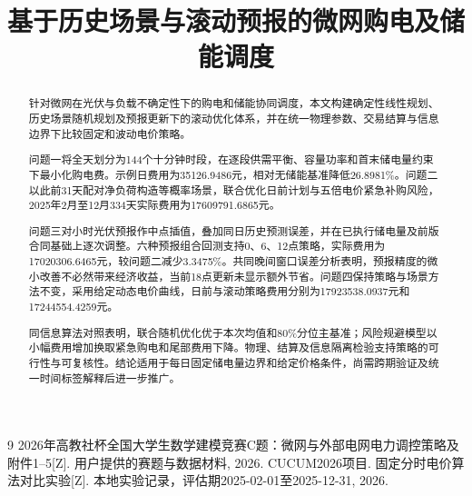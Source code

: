 \documentclass[withoutpreface,bwprint]{cumcmthesis}
\title{基于历史场景与滚动预报的微网购电及储能调度}
\begin{document}
\maketitle
\begin{abstract}
针对微网在光伏与负载不确定性下的购电和储能协同调度，本文构建确定性线性规划、历史场景随机规划及预报更新下的滚动优化体系，并在统一物理参数、交易结算与信息边界下比较固定和波动电价策略。

问题一将全天划分为144个十分钟时段，在逐段供需平衡、容量功率和首末储电量约束下最小化购电费。示例日费用为35126.9486元，相对无储能基准降低26.8981\%。问题二以此前31天配对净负荷构造等概率场景，联合优化日前计划与五倍电价紧急补购风险，2025年2月至12月334天实际费用为17609791.6865元。

问题三对小时光伏预报作中点插值，叠加同日历史预测误差，并在已执行储电量及前版合同基础上逐次调整。六种预报组合回测支持0、6、12点策略，实际费用为17020306.6465元，较问题二减少3.3475\%。共同晚间窗口误差分析表明，预报精度的微小改善不必然带来经济收益，当前18点更新未显示额外节省。问题四保持策略与场景方法不变，采用给定动态电价曲线，日前与滚动策略费用分别为17923538.0937元和17244554.4259元。

同信息算法对照表明，联合随机优化优于本次均值和80\%分位主基准；风险规避模型以小幅费用增加换取紧急购电和尾部费用下降。物理、结算及信息隔离检验支持策略的可行性与可复核性。结论适用于每日固定储电量边界和给定价格条件，尚需跨期验证及统一时间标签解释后进一步推广。

\end{abstract}






\begin{thebibliography}{9}
 2026年高教社杯全国大学生数学建模竞赛C题：微网与外部电网电力调控策略及附件1--5[Z]. 用户提供的赛题与数据材料, 2026.
 CUCUM2026项目. 固定分时电价算法对比实验[Z]. 本地实验记录，评估期2025-02-01至2025-12-31, 2026.
\end{thebibliography}
\end{document}
